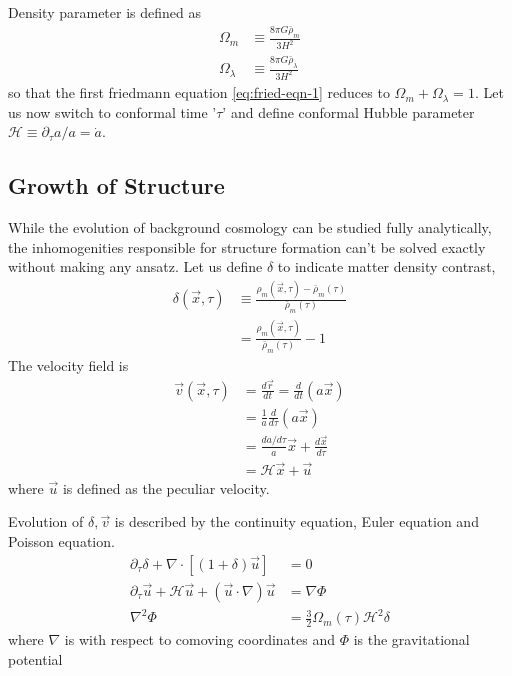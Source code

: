 \documentclass[12pt,twocolumn]{article}
\begin{document}
Density parameter is defined as
\begin{align}
\Omega_{m} &\equiv \frac{8 \pi G \bar{\rho}_{m}}{3 H^2}\\
\Omega_{\lambda} &\equiv \frac{8 \pi G \bar{\rho}_{\lambda}}{3 H^2}
\end{align}
%
so that the first friedmann equation \ref{eq:fried-eqn-1} reduces to $\Omega_{m} + \Omega_{\lambda} = 1$. Let us now switch to conformal time '$\tau$' and define conformal Hubble parameter $\mathcal{H} \equiv \partial_\tau a / a = \dot{a}$. 


\subsection{Growth of Structure}
While the evolution of background cosmology can be studied fully analytically, the inhomogenities responsible for structure formation can't be solved exactly without making any ansatz. Let us define $\delta$ to indicate matter density contrast,
\begin{align}
\nonumber
\delta (\vec{x}, \tau) &\equiv \frac{{\rho}_{m} (\vec{x}, \tau) -\bar{\rho}_{m} (\tau) }{\bar{\rho}_{m} (\tau)} \\
&= \frac{{\rho}_{m} (\vec{x}, \tau) }{\bar{\rho}_{m} (\tau)} - 1
\end{align}
The velocity field is
\begin{align}
\vec{v} (\vec{x}, \tau) &= \frac{d \vec{r}}{dt} = \frac{d }{dt} (a \vec{x})\\
&= \frac{1}{a} \frac{d }{d \tau} (a \vec{x})\\
&= \frac{da/d \tau}{a} \vec{x} + \frac{d \vec{x}}{d \tau}\\
&= \mathcal{H} \vec{x} + \vec{u}
\end{align}
where $\vec{u}$ is defined as the peculiar velocity.

Evolution of $\delta, \vec{v}$ is described by the continuity equation, Euler equation and Poisson equation.
\begin{align}
\partial_{\tau} \delta + \nabla \cdot \left[ (1+ \delta) \vec{u} \right] &= 0\\
\partial_{\tau} \vec{u} + \mathcal{H} \vec{u} + \left( \vec{u} \cdot \nabla \right)  \vec{u} &= \nabla \Phi\\
\nabla^2 \Phi &= \frac{3}{2} \Omega_{m}(\tau) \mathcal{H}^2 \delta
\end{align}
where $\nabla$ is with respect to comoving coordinates and $\Phi$ is the gravitational potential
\end{document}
